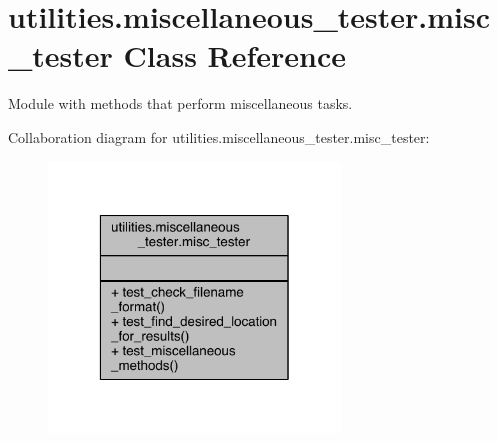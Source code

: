 \hypertarget{classutilities_1_1miscellaneous__tester_1_1misc__tester}{}\section{utilities.\+miscellaneous\+\_\+tester.\+misc\+\_\+tester Class Reference}
\label{classutilities_1_1miscellaneous__tester_1_1misc__tester}


Module with methods that perform miscellaneous tasks.  




Collaboration diagram for utilities.\+miscellaneous\+\_\+tester.\+misc\+\_\+tester\+:
\nopagebreak
\begin{figure}[H]
\begin{center}
\leavevmode
\includegraphics[width=220pt]{dc/de9/classutilities_1_1miscellaneous__tester_1_1misc__tester__coll__graph}
\end{center}
\end{figure}
